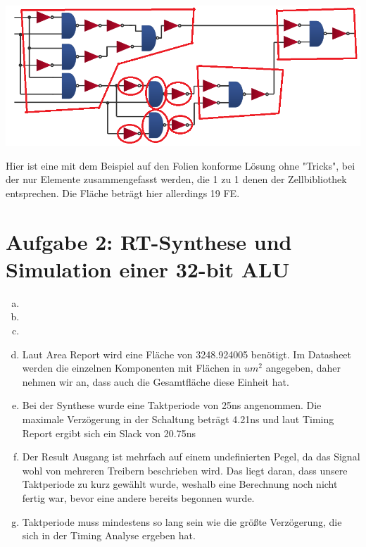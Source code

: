 \documentclass[a4paper]{scrartcl}
\begin{document}
\begin{enumerate}[(a)]
		
\includegraphics[scale=1]{blatt7grafik2.png}		
	
	Hier ist eine mit dem Beispiel auf den Folien konforme Lösung ohne "Tricks", bei der nur Elemente zusammengefasst werden, die 1 zu 1 denen der Zellbibliothek entsprechen. Die Fläche beträgt hier allerdings 19 FE.
		
		
	\end{enumerate}
	\newpage
	\section*{Aufgabe 2: RT-Synthese und Simulation einer 32-bit ALU}
	
	\begin{enumerate}[(a)]
		\item 
		\item 
		\item 
		\item Laut Area Report wird eine Fläche von 3248.924005 benötigt. Im Datasheet werden die einzelnen Komponenten mit Flächen in $um^2$ angegeben, daher nehmen wir an, dass auch die Gesamtfläche diese Einheit hat.
		
		\item Bei der Synthese wurde eine Taktperiode von 25ns angenommen. Die maximale Verzögerung in der Schaltung beträgt 4.21ns und laut Timing Report ergibt sich ein Slack von 20.75ns
		\item Der Result Ausgang ist mehrfach auf einem undefinierten Pegel, da das Signal wohl von mehreren Treibern beschrieben wird. Das liegt daran, dass unsere Taktperiode zu kurz gewählt wurde, weshalb eine Berechnung noch nicht fertig war, bevor eine andere bereits begonnen wurde.
		\item Taktperiode muss mindestens so lang sein wie die größte Verzögerung, die sich in der Timing Analyse ergeben hat.
	\end{enumerate}

	
\end{document}
